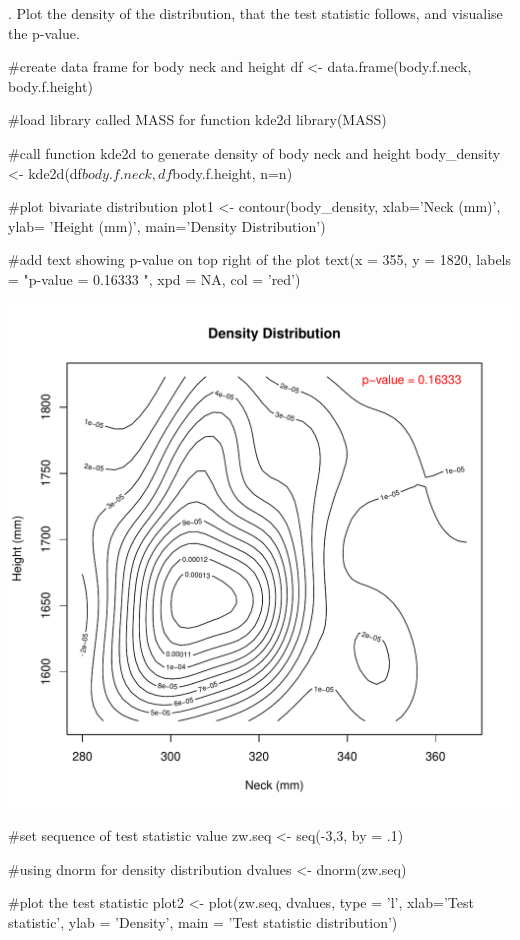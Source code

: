 \documentclass[12pt, oneside]{report}\usepackage[]{graphicx}\usepackage[]{color}
\makeatletter
\def\maxwidth{ %
  \ifdim\Gin@nat@width>\linewidth
    \linewidth
  \else
    \Gin@nat@width
  \fi
}
\makeatother
\begin{document}
. Plot the density of the distribution, that the test statistic follows, and visualise the p-value.
\begin{Schunk}
\begin{Sinput}
#create data frame for body neck and height
df <- data.frame(body.f.neck, body.f.height)

#load library called MASS for function kde2d
library(MASS)

#call function kde2d to generate density of body neck and height
body_density <- kde2d(df$body.f.neck, df$body.f.height, n=n)

#plot bivariate distribution
plot1 <- contour(body_density, xlab='Neck (mm)', ylab= 'Height (mm)', main='Density Distribution')

#add text showing p-value on top right of the plot
text(x = 355, y = 1820, labels = "p-value = 0.16333 ", xpd = NA, col = 'red')
\end{Sinput}

\includegraphics[width=\maxwidth]{figure/unnamed-chunk-7-1} \begin{Sinput}
#set sequence of test statistic value
zw.seq <- seq(-3,3, by = .1) 

#using dnorm for density distribution
dvalues <- dnorm(zw.seq)

#plot the test statistic
plot2 <- plot(zw.seq, dvalues, type = 'l', xlab='Test statistic', ylab = 'Density', main = 'Test statistic distribution')


\end{Sinput}
\end{Schunk}
\end{document}
